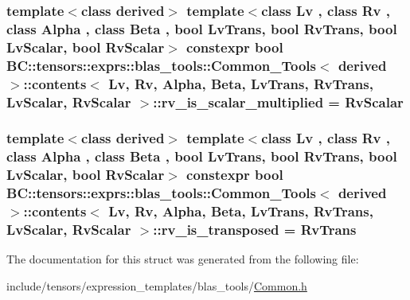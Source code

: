 \subsubsection[{\texorpdfstring{rv\+\_\+is\+\_\+scalar\+\_\+multiplied}{rv_is_scalar_multiplied}}]{\setlength{\rightskip}{0pt plus 5cm}template$<$class derived$>$ template$<$class Lv , class Rv , class Alpha , class Beta , bool Lv\+Trans, bool Rv\+Trans, bool Lv\+Scalar, bool Rv\+Scalar$>$ constexpr bool {\bf B\+C\+::tensors\+::exprs\+::blas\+\_\+tools\+::\+Common\+\_\+\+Tools}$<$ derived $>$\+::{\bf contents}$<$ Lv, Rv, Alpha, Beta, Lv\+Trans, Rv\+Trans, Lv\+Scalar, Rv\+Scalar $>$\+::rv\+\_\+is\+\_\+scalar\+\_\+multiplied = Rv\+Scalar\hspace{0.3cm}{\ttfamily [static]}}\hypertarget{structBC_1_1tensors_1_1exprs_1_1blas__tools_1_1Common__Tools_1_1contents_a2c7331298412fddb5426de9abc1bdd8b}{}\label{structBC_1_1tensors_1_1exprs_1_1blas__tools_1_1Common__Tools_1_1contents_a2c7331298412fddb5426de9abc1bdd8b}
\subsubsection[{\texorpdfstring{rv\+\_\+is\+\_\+transposed}{rv_is_transposed}}]{\setlength{\rightskip}{0pt plus 5cm}template$<$class derived$>$ template$<$class Lv , class Rv , class Alpha , class Beta , bool Lv\+Trans, bool Rv\+Trans, bool Lv\+Scalar, bool Rv\+Scalar$>$ constexpr bool {\bf B\+C\+::tensors\+::exprs\+::blas\+\_\+tools\+::\+Common\+\_\+\+Tools}$<$ derived $>$\+::{\bf contents}$<$ Lv, Rv, Alpha, Beta, Lv\+Trans, Rv\+Trans, Lv\+Scalar, Rv\+Scalar $>$\+::rv\+\_\+is\+\_\+transposed = Rv\+Trans\hspace{0.3cm}{\ttfamily [static]}}\hypertarget{structBC_1_1tensors_1_1exprs_1_1blas__tools_1_1Common__Tools_1_1contents_ac335e81c0594905f737813302dc4b838}{}\label{structBC_1_1tensors_1_1exprs_1_1blas__tools_1_1Common__Tools_1_1contents_ac335e81c0594905f737813302dc4b838}


The documentation for this struct was generated from the following file\+:\begin{DoxyCompactItemize}
\item 
include/tensors/expression\+\_\+templates/blas\+\_\+tools/\hyperlink{tensors_2expression__templates_2blas__tools_2Common_8h}{Common.\+h}\end{DoxyCompactItemize}
